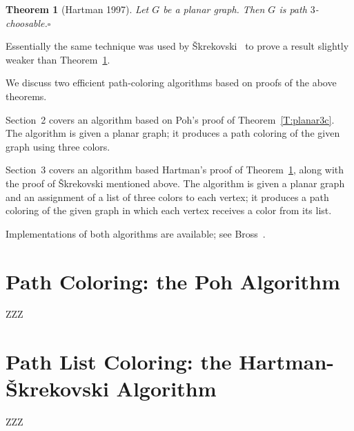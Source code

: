 \documentclass[12pt,letterpaper]{article}
\theoremstyle{plain}
\newtheorem{theorem}[lemma]{Theorem}         %
\theoremstyle{definition}
\newcommand{\ggcqedsymbol}{$\square$}
\newcommand{\ggcqed}{\hbox{}\nobreak\hbox{\quad\ggcqedsymbol}}
\newcommand{\ggcnopf}{\ggcqed}
\begin{document}
\begin{theorem}[Hartman 1997] \label{T:planar3}
Let $G$ be a planar graph.
Then $G$ is path $3$-choosable.\ggcnopf\end{theorem}

Essentially the same technique was used by
\v{S}krekovski~\cite[Thm.~2.2b]{Skr1999}
to prove a result slightly weaker than Theorem~\ref{T:planar3}.

\medskip

We discuss two efficient path-coloring algorithms
based on proofs of the above theorems.

Section~2 covers an algorithm
based on Poh's proof of Theorem~\ref{T:planar3c}.
The algorithm is given a planar graph;
it produces a path coloring of the given graph
using three colors.

Section~3 covers an algorithm
based Hartman's proof of Theorem~\ref{T:planar3},
along with the proof of \v{S}krekovski mentioned above.
The algorithm is given a planar graph
and an assignment of a list of three colors to each vertex;
it produces a path coloring of the given graph
in which each vertex receives a color from its list.

Implementations of both algorithms are available;
see Bross~\cite{Bro2017}.


\section{Path Coloring: the Poh Algorithm}

ZZZ


\section{Path List Coloring: the Hartman-\v{S}krekovski Algorithm}

ZZZ
\end{document}
